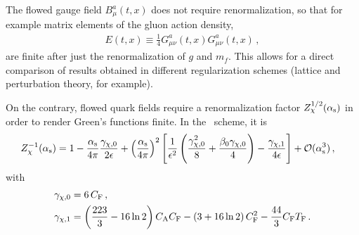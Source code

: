 The flowed gauge field $B^a_\mu(t,x)$ does not require renormalization,
so that for example matrix elements of the gluon action density,
\begin{align}
  E (t,x) \equiv \frac{1}{4} G_{\mu \nu}^a(t,x) G_{\mu \nu}^a(t,x)\,,
  \label{eq:def_E}
\end{align}
are finite after just the renormalization of $g$ and $m_f$.
This allows for a direct comparison of results
obtained in different regularization schemes (lattice and perturbation
theory, for example).

On the contrary, flowed quark fields require a renormalization factor
$Z_\chi^{1/2}(\alpha_\mathrm{s})$ in order to render Green's functions finite. In
the \msbar\ scheme, it
is\,\cite{Luscher:2010iy,Harlander:2018zpi}
\begin{equation}
  \begin{split}
        Z^{-1}_\chi(\alpha_\mathrm{s}) &= 1
        -\frac{\alpha_\mathrm{s}}{4\pi}\frac{\gamma_{\chi,0}}{2\epsilon}
        +\left(\frac{\alpha_\mathrm{s}}{4\pi}\right)^2\left[\frac{1}{\epsilon^2}\left(
          \frac{\gamma_{\chi,0}^2}{8} +
          \frac{\beta_0\gamma_{\chi,0}}{4}\right)
          -\frac{\gamma_{\chi,1}}{4\epsilon}\right] + {\cal O}(\alpha_\mathrm{s}^3)\,,
  \end{split}
\end{equation}
with
\begin{equation}
  \begin{split}
  \gamma_{\chi,0} &= 6\,C_\mathrm{F}\,,\\
  \gamma_{\chi, 1} &=
  \left( \frac{223}{3} - 16 \ln 2 \right) C_\mathrm{A} C_\mathrm{F} - \left( 3 + 16
  \ln 2 \right) C_\mathrm{F}^2 - \frac{44}{3} C_\mathrm{F} T_\mathrm{F}\,.
  \end{split}
\end{equation}

